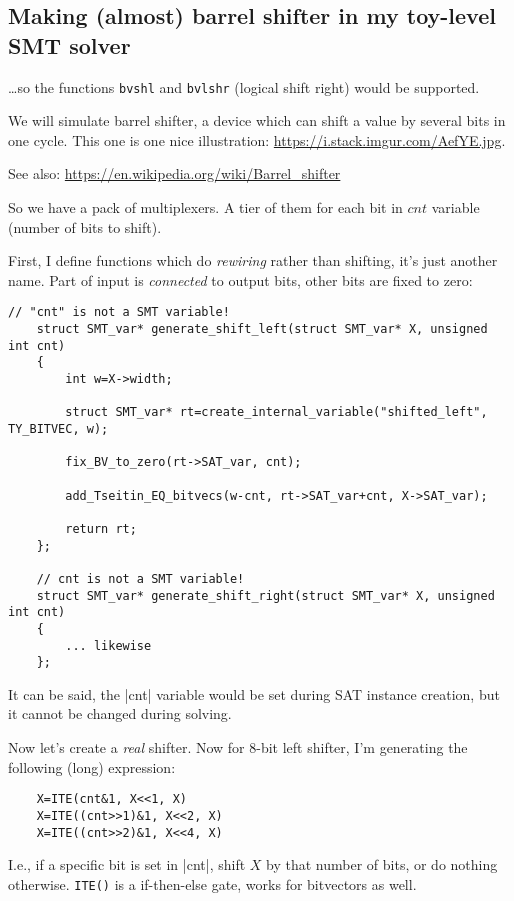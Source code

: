 \subsection{Making (almost) barrel shifter in my toy-level SMT solver}

\dots so the functions \verb|bvshl| and \verb|bvlshr| (logical shift right) would be supported.

We will simulate barrel shifter, a device which can shift a value by several bits in one cycle.
This one is one nice illustration:
\url{https://i.stack.imgur.com/AefYE.jpg}.


See also: \url{https://en.wikipedia.org/wiki/Barrel_shifter}

So we have a pack of multiplexers. A tier of them for each bit in $cnt$ variable (number of bits to shift).

First, I define functions which do \emph{rewiring} rather than shifting, it's just another name.
Part of input is \emph{connected} to output bits, other bits are fixed to zero:

\begin{lstlisting}[style=customc]
	// "cnt" is not a SMT variable!
	struct SMT_var* generate_shift_left(struct SMT_var* X, unsigned int cnt)
	{
		int w=X->width;

		struct SMT_var* rt=create_internal_variable("shifted_left", TY_BITVEC, w);

		fix_BV_to_zero(rt->SAT_var, cnt);

		add_Tseitin_EQ_bitvecs(w-cnt, rt->SAT_var+cnt, X->SAT_var);

		return rt;
	};

	// cnt is not a SMT variable!
	struct SMT_var* generate_shift_right(struct SMT_var* X, unsigned int cnt)
	{
		... likewise
	};
\end{lstlisting}

It can be said, the |cnt| variable would be set during SAT instance creation, but it cannot be changed during solving.

Now let's create a \emph{real} shifter.
Now for 8-bit left shifter, I'm generating the following (long) expression:

\begin{lstlisting}
	X=ITE(cnt&1, X<<1, X)
	X=ITE((cnt>>1)&1, X<<2, X)
	X=ITE((cnt>>2)&1, X<<4, X)
\end{lstlisting}

I.e., if a specific bit is set in |cnt|, shift $X$ by that number of bits, or do nothing otherwise.
\verb|ITE()| is a if-then-else gate, works for bitvectors as well.

